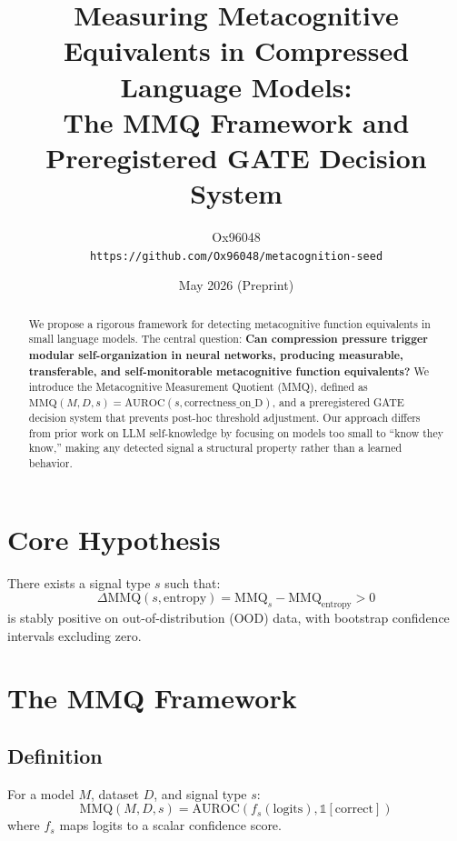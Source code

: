 \documentclass{article}
\title{Measuring Metacognitive Equivalents in Compressed Language Models: \\
The MMQ Framework and Preregistered GATE Decision System}
\author{Ox96048 \\ \texttt{https://github.com/Ox96048/metacognition-seed}}
\date{May 2026 (Preprint)}
\begin{document}
\maketitle

\begin{abstract}
We propose a rigorous framework for detecting metacognitive function equivalents in small language models. The central question: \textbf{Can compression pressure trigger modular self-organization in neural networks, producing measurable, transferable, and self-monitorable metacognitive function equivalents?} We introduce the Metacognitive Measurement Quotient (MMQ), defined as $\text{MMQ}(M, D, s) = \text{AUROC}(s, \text{correctness\_on\_D})$, and a preregistered GATE decision system that prevents post-hoc threshold adjustment. Our approach differs from prior work on LLM self-knowledge by focusing on models too small to ``know they know,'' making any detected signal a structural property rather than a learned behavior.
\end{abstract}

\section{Core Hypothesis}

There exists a signal type $s$ such that:
\begin{equation}
\Delta\text{MMQ}(s, \text{entropy}) = \text{MMQ}_s - \text{MMQ}_{\text{entropy}} > 0
\end{equation}
is stably positive on out-of-distribution (OOD) data, with bootstrap confidence intervals excluding zero.

\section{The MMQ Framework}

\subsection{Definition}
For a model $M$, dataset $D$, and signal type $s$:
\begin{equation}
\text{MMQ}(M, D, s) = \text{AUROC}(f_s(\text{logits}), \mathbb{1}[\text{correct}])
\end{equation}
where $f_s$ maps logits to a scalar confidence score.
\end{document}
